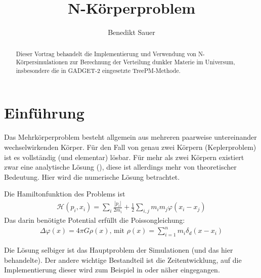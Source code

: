 \documentclass[a4paper]{scrartcl}
\author{Benedikt Sauer}
\title{N-Körperproblem}
\begin{document}
\maketitle
\begin{abstract}
  Dieser Vortrag behandelt die Implementierung und Verwendung von
  N-Körpersimulationen zur Berechnung der Verteilung dunkler Materie im
  Universum, insbesondere die in GADGET-2 eingesetzte TreePM-Methode.
\end{abstract}
\section{Einführung}
Das Mehrkörperproblem besteht allgemein aus mehreren paarweise untereinander
wechselwirkenden Körper. Für den Fall von genau zwei Körpern (Keplerproblem) ist
es vollständig (und elementar) lösbar. Für mehr als zwei Körpern existiert zwar
eine analytische Lösung (\cite{wang}), diese ist allerdings mehr von
theoretischer Bedeutung. Hier wird die numerische Lösung betrachtet.

Die Hamiltonfunktion des Problems ist
\begin{align}
  \mathcal{H}(p_i, x_i) = \sum_i \frac{\left|p_i\right|}{2m_i} +
  \frac{1}{2} \sum_{i,j} m_i m_j \varphi(x_i - x_j)
  \label{eq:hamilton}
\end{align}
Das darin benötigte Potential erfüllt die Poissongleichung:
\begin{align}
  \Delta \varphi(x) = 4\pi G \rho(x)\text{, mit }\rho(x) = \sum_{i=1}^n m_i
  \delta_d(x - x_i)
  \label{eq:poisson}
\end{align}

Die Lösung selbiger ist das Hauptproblem der Simulationen (und das hier
behandelte). Der andere wichtige Bestandteil ist die Zeitentwicklung, auf die
Implementierung dieser wird zum Beispiel in \cite{gadget-zeit} oder
\cite{gadget-zeit2} näher eingegangen.
\end{document}
